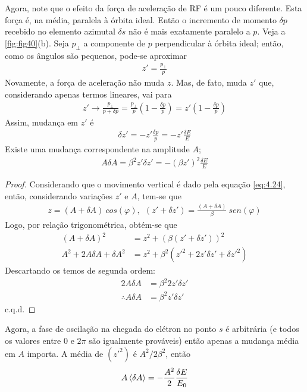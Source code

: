 Agora, note que o efeito da força de aceleração de RF é um pouco diferente. Esta força é, na média, paralela à órbita ideal. Então o incremento de momento $\delta p$ recebido no elemento azimutal $\delta s$ não é mais exatamente paralelo a $p$. Veja a \autoref{fig:fig40}(b). Seja $p_\perp$ a componente  de $p$ perpendicular à órbita ideal; então, como os ângulos são pequenos, pode-se aproximar
\begin{align*}
	z' = \frac{p_\perp}{p}
\end{align*}
Novamente, a força de aceleração não muda $z$. Mas, de fato, muda $z'$ que, considerando apenas termos lineares, vai para
\begin{align}
	z' \rightarrow \frac{p_\perp}{p+\delta p} = \frac{p_\perp}{p}\left(1-\frac{\delta p}{p}\right) = z'\left(1-\frac{\delta p}{p}\right)
\end{align}
Assim, mudança em $z'$ é
\begin{align}
	\delta z' = -z'\frac{\delta p}{p} = -z'\frac{\delta E}{E}
\end{align}
Existe uma mudança correspondente na amplitude $A$;
\begin{align}
	A\delta A = \beta^2 z' \delta z' = -(\beta z')^2 \frac{\delta E}{E}
\end{align}

\begin{proof}
	Considerando que o movimento vertical é dado pela equação \eqref{eq:4.24}, então, considerando variações $z'$ e $A$, tem-se que
	\begin{align*}
		z = (A+\delta A)\ cos(\varphi), \ \ (z' + \delta z') = \frac{(A+\delta A)}{\beta}\ sen(\varphi)
	\end{align*}
	Logo, por relação trigonométrica, obtém-se que
	\begin{align*}
		(A+\delta A)^2 &= z^2 + (\beta (z'+\delta z'))^2\\
		A^2+2 A \delta A + \delta A^2 &= z^2 + \beta^2 (z'^2 + 2z'\delta z' + \delta z'^2)
	\end{align*}
	Descartando os temos de segunda ordem:
	\begin{align*}
		2 A \delta A &= \beta^2 2z'\delta z'\\
		\therefore A\delta A &= \beta^2 z' \delta z'
	\end{align*}
	c.q.d.
\end{proof}

Agora, a fase de oscilação na chegada do elétron no ponto $s$ é arbitrária (e todos os valores entre $0$ e $2\pi$ são igualmente prováveis) então apenas a mudança média em $A$ importa. A média de $(z'^2)$ é $A^2/2\beta^2$, então
\begin{align}
	A\left< \delta A \right> = -\frac{A^2}{2}\frac{\delta E}{E_0}
\end{align}

